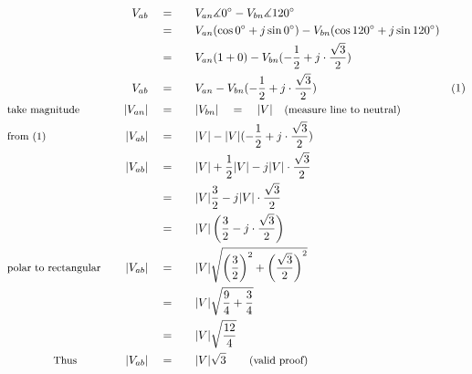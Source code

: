 \begin{alignat*}{5}
&\,&V_{ab}\quad&=\quad&&V_{an}\measuredangle0^\circ-V_{bn}\measuredangle120^\circ\\
&\,&\,&=&& V_{an}(\cos{0^\circ}+j\sin{{0^\circ}})-V_{bn}(\cos{120^\circ}+j\sin{{120^\circ}})\\
&\,&\,&=&&V_{an}(1+0)-V_{bn}(-\frac{1}{2}+j\cdot\frac{\sqrt{3}}{2})\\
&\,&V_{ab}\quad&=&&V_{an}-V_{bn}(-\frac{1}{2}+j\cdot\frac{\sqrt{3}}{2})\qquad&\small\text(1)\\
&\small\text{take magnitude}&|V_{an}|\quad&=&&|V_{bn}|\quad=\quad|V|\quad\small\text{(measure line to neutral)}\\
&\small\text{from (1)}&|V_{ab}|\quad&=&&|V|-|V|(-\frac{1}{2}+j\cdot\frac{\sqrt{3}}{2})\\
&\,&|V_{ab}|\quad&=&&|V|+\frac{1}{2}|V|-j|V|\cdot\frac{\sqrt{3}}{2}\\
&\,&\,&=&&|V|\frac{3}{2}-j|V|\cdot\frac{\sqrt{3}}{2}\\
&\,&\,&=&&|V|\left(\frac{3}{2}-j\cdot\frac{\sqrt{3}}{2}\right)\\
&\small\text{polar to rectangular}\normalsize\quad&|V_{ab}|\quad&=&&|V|\sqrt{\left(\frac{3}{2}\right)^2+\left(\frac{\sqrt{3}}{2}\right)^2}\\
&\,&\,&=&&|V|\sqrt{\frac{9}{4}+\frac{3}{4}}\\
&\,&\,&=&&|V|\sqrt{\frac{12}{4}}\\
&\qquad\qquad\small\text{Thus}\normalsize\qquad&|V_{ab}|\quad&=&&|V|\sqrt{3}\qquad\small\text{(valid proof)}\\
\end{alignat*}
